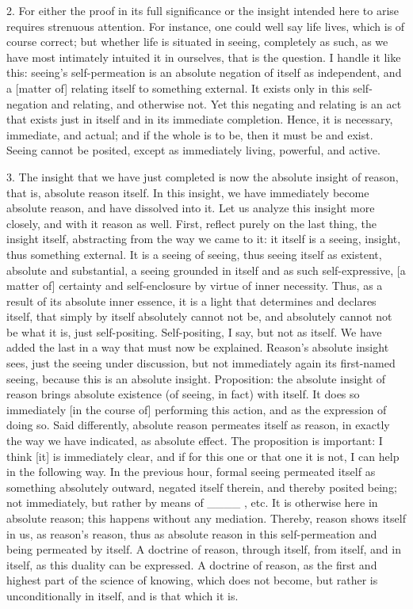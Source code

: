 2. For either the proof in its full significance
or the insight intended here to arise
requires strenuous attention.
For instance, one could well say life lives,
which is of course correct;
but whether life is situated in seeing,
completely as such,
as we have most intimately intuited it in ourselves,
that is the question.
I handle it like this:
seeing’s self-permeation is
an absolute negation of itself as independent,
and a [matter of] relating itself to something external.
It exists only in this self-negation and relating,
and otherwise not.
Yet this negating and relating is
an act that exists just in itself
and in its immediate completion.
Hence, it is necessary, immediate, and actual;
and if the whole is to be,
then it must be and exist.
Seeing cannot be posited,
except as immediately living, powerful, and active.

3. The insight that we have just completed is
now the absolute insight of reason,
that is, absolute reason itself.
In this insight, we have
immediately become absolute reason,
and have dissolved into it.
Let us analyze this insight more closely,
and with it reason as well.
First, reflect purely on the last thing,
the insight itself,
abstracting from the way we came to it:
it itself is a seeing, insight,
thus something external.
It is a seeing of seeing,
thus seeing itself as existent,
absolute and substantial,
a seeing grounded in itself
and as such self-expressive,
[a matter of] certainty and self-enclosure
by virtue of inner necessity.
Thus, as a result of its absolute inner essence,
it is a light that determines and declares itself,
that simply by itself absolutely cannot not be,
and absolutely cannot not be what it is,
just self-positing.
Self-positing, I say, but not as itself.
We have added the last in a way that must now be explained.
Reason’s absolute insight sees,
just the seeing under discussion,
but not immediately again its first-named seeing,
because this is an absolute insight.
Proposition: the absolute insight of reason
brings absolute existence
(of seeing, in fact) with itself.
It does so immediately [in the course of]
performing this action,
and as the expression of doing so.
Said differently, absolute reason
permeates itself as reason,
in exactly the way we have indicated,
as absolute effect.
The proposition is important:
I think [it] is immediately clear,
and if for this one or that one it is not,
I can help in the following way.
In the previous hour,
formal seeing permeated itself
as something absolutely outward,
negated itself therein,
and thereby posited being;
not immediately, but rather by means of ____ , etc.
It is otherwise here in absolute reason;
this happens without any mediation.
Thereby, reason shows itself in us, as reason’s reason,
thus as absolute reason in this self-permeation
and being permeated by itself.
A doctrine of reason,
through itself, from itself, and in itself,
as this duality can be expressed.
A doctrine of reason,
as the first and highest part
of the science of knowing,
which does not become,
but rather is unconditionally in itself,
and is that which it is.

